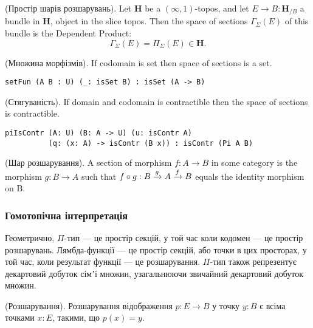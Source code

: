 \begin{definition} (Простір шарів розшарувань).
Let $\mathbf{H}$ be a $(\infty,1)$-topos, and let $E \rightarrow B : \mathbf{H}_{/B}$ a bundle in
$\mathbf{H}$, object in the slice topos. Then the space of sections $\Gamma_\Sigma(E)$
of this bundle is the Dependent Product:
$$ \Gamma_\Sigma(E) = \Pi_\Sigma (E) \in \mathbf{H}. $$
\end{definition}

\begin{theorem} (Множина морфізмів).
If codomain is set then space of sections is a set.
\begin{lstlisting}
setFun (A B : U) (_: isSet B) : isSet (A -> B)
\end{lstlisting}
\end{theorem}

\begin{theorem} (Стягуваність).
If domain and codomain is contractible then the space of sections is contractible.
\begin{lstlisting}
piIsContr (A: U) (B: A -> U) (u: isContr A)
          (q: (x: A) -> isContr (B x)) : isContr (Pi A B)
\end{lstlisting}
\end{theorem}

\begin{definition} (Шар розшарування).
A section of morphism $f: A \rightarrow B$ in some category is the morphism $g: B \rightarrow A$
such that $f \circ g: B \xrightarrow{{g}} A \xrightarrow{{f}} B$ equals the identity morphism on B.
\end{definition}

\subsubsection*{Гомотопічна інтерпретація}
Геометрично, $\Pi$-тип — це простір секцій, у той час коли кодомен — це простір розшарувань.
Лямбда-функції — це простір секцій, або точки в цих просторах, у той час, коли результат функції — це розшарування.
$\Pi$-тип також репрезентує декартовий добуток сімʼї множин, узагальнюючи звичайний декартовий добуток множин.

\begin{definition} (Розшарування).
Розшарування відображення $p: E \rightarrow B$ у точку $y: B$ є всіма точками $x: E$, такими, що $p(x)=y$.
\end{definition}

